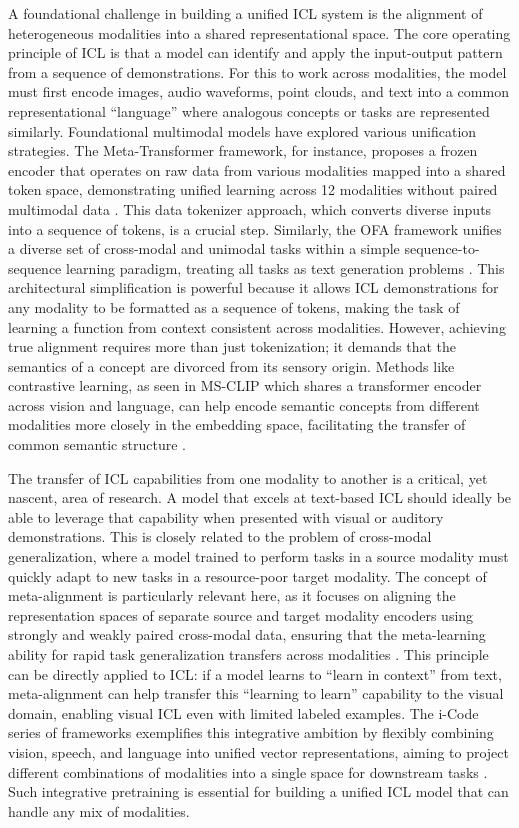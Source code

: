 \documentclass[11pt]{article}
\begin{document}
A foundational challenge in building a unified ICL system is the alignment of heterogeneous modalities into a shared representational space. The core operating principle of ICL is that a model can identify and apply the input-output pattern from a sequence of demonstrations. For this to work across modalities, the model must first encode images, audio waveforms, point clouds, and text into a common representational ``language'' where analogous concepts or tasks are represented similarly. Foundational multimodal models have explored various unification strategies. The Meta-Transformer framework, for instance, proposes a frozen encoder that operates on raw data from various modalities mapped into a shared token space, demonstrating unified learning across 12 modalities without paired multimodal data \cite{ref640}. This data tokenizer approach, which converts diverse inputs into a sequence of tokens, is a crucial step. Similarly, the OFA framework unifies a diverse set of cross-modal and unimodal tasks within a simple sequence-to-sequence learning paradigm, treating all tasks as text generation problems \cite{ref641}. This architectural simplification is powerful because it allows ICL demonstrations for any modality to be formatted as a sequence of tokens, making the task of learning a function from context consistent across modalities. However, achieving true alignment requires more than just tokenization; it demands that the semantics of a concept are divorced from its sensory origin. Methods like contrastive learning, as seen in MS-CLIP which shares a transformer encoder across vision and language, can help encode semantic concepts from different modalities more closely in the embedding space, facilitating the transfer of common semantic structure \cite{ref295}.

The transfer of ICL capabilities from one modality to another is a critical, yet nascent, area of research. A model that excels at text-based ICL should ideally be able to leverage that capability when presented with visual or auditory demonstrations. This is closely related to the problem of cross-modal generalization, where a model trained to perform tasks in a source modality must quickly adapt to new tasks in a resource-poor target modality. The concept of meta-alignment is particularly relevant here, as it focuses on aligning the representation spaces of separate source and target modality encoders using strongly and weakly paired cross-modal data, ensuring that the meta-learning ability for rapid task generalization transfers across modalities \cite{ref642}. This principle can be directly applied to ICL: if a model learns to ``learn in context'' from text, meta-alignment can help transfer this ``learning to learn'' capability to the visual domain, enabling visual ICL even with limited labeled examples. The i-Code series of frameworks exemplifies this integrative ambition by flexibly combining vision, speech, and language into unified vector representations, aiming to project different combinations of modalities into a single space for downstream tasks \cite{ref283,ref643}. Such integrative pretraining is essential for building a unified ICL model that can handle any mix of modalities.
\end{document}
